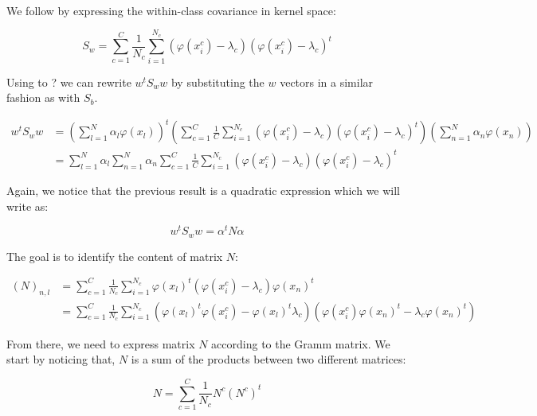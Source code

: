 \paragraph{}
We follow by expressing the within-class covariance in kernel space:

\begin{equation*}
S_w = \sum_{c = 1}^C \frac{1}{N_c} \sum_{i = 1}^{N_c} (\varphi(x_i^c) - \lambda_c)(\varphi(x_i^c) -
\lambda_c)^t
\end{equation*}

Using to ? we can rewrite $w^tS_ww$ by substituting the $w$ vectors in a similar fashion as
with $S_b$.

\begin{align*}
  w^tS_ww &= \left( \sum_{l=1}^N \alpha_l \varphi(x_l)\right)^t
             \left( \sum_{c=1}^C \frac{1}{C}
                       \sum_{i=1}^{N_c} (\varphi(x_i^c) - \lambda_c)
                                        (\varphi(x_i^c) - \lambda_c)^t\right)
             \left( \sum_{n=1}^N \alpha_n \varphi(x_n)\right)\\
          &= \sum_{l=1}^N \alpha_l \sum_{n=1}^N \alpha_n \sum_{c=1}^C \frac{1}{C}
                \sum_{i=1}^{N_c} (\varphi(x_i^c) - \lambda_c)
                                 (\varphi(x_i^c) - \lambda_c)^t
\end{align*}

Again, we notice that the previous result is a quadratic expression which we will write as:

\begin{equation*}
w^tS_ww = \alpha^tN\alpha
\end{equation*}

The goal is to identify the content of matrix $N$:

\begin{align*}
  (N)_{n,l} &= \sum_{c=1}^C \frac{1}{N_c} \sum_{i=1}^{N_c}
                  \varphi(x_l)^t(\varphi(x_i^c) - \lambda_c)\varphi(x_n)^t \\
            &= \sum_{c=1}^C \frac{1}{N_c} \sum_{i=1}^{N_c} (\varphi(x_l)^t\varphi(x_i^c) -
            \varphi(x_l)^t\lambda_c) (\varphi(x_i^c)\varphi(x_n)^t -
            \lambda_c \varphi(x_n)^t)
\end{align*}

From there, we need to express matrix $N$ according to the Gramm matrix. We start by noticing that,
$N$ is a sum of the products between two different matrices:

\begin{equation*}
N = \sum_{c=1}^C \frac{1}{N_c} N^c (N^c)^t
\end{equation*}

